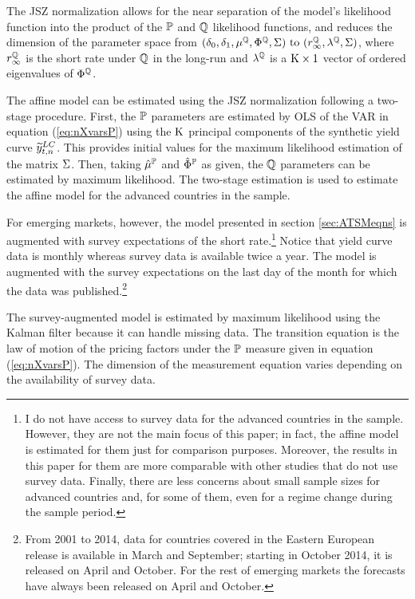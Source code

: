 {The JSZ normalization allows for the near separation of the model's likelihood function into the product of the $\mathbb{P}$ and $\mathbb{Q}$ likelihood functions, and reduces the dimension of the parameter space from \((\deltazero, \deltaone, \XmuQ, \XPhiQ, \XSigma)$ to $(r^{\Qmeasure}_{\infty}, \lambda^{\Qmeasure},\XSigma)\), where \(r^{\mathbb{Q}}_{\infty}\) is the short rate under \(\mathbb{Q}\) in the long-run and \(\lambda^{\mathbb{Q}}\) is a \(\mathrm{K} \times 1\) vector of ordered eigenvalues of \(\Phi^{\mathbb{Q}}\).

The affine model can be estimated using the JSZ normalization following a two-stage procedure. 
First, the \(\mathbb{P}\) parameters are estimated by OLS of the VAR in equation (\ref{eq:nXvarsP}) using the \(\mathrm{K}\) principal components of the synthetic yield curve \(\widetilde{y}_{t,n} ^{LC}\). This provides initial values for the maximum likelihood estimation of the matrix $\Sigma$. Then, taking \(\hat{\mu}^{\mathbb{P}}\) and \(\hat{\Phi}^{\mathbb{P}}\) as given, the \(\mathbb{Q}\) parameters can be estimated by maximum likelihood. The two-stage estimation is used to estimate the affine model for the advanced countries in the sample.

For emerging markets, however, the model presented in section \ref{sec:ATSMeqns} is augmented with survey expectations of the short rate.\footnote{ I do not have access to survey data for the advanced countries in the sample. However, they are not the main focus of this paper; in fact, the affine model is estimated for them just for comparison purposes. Moreover, the results in this paper for them are more comparable with other studies that do not use survey data. Finally, there are less concerns about small sample sizes for advanced countries and, for some of them, even for a regime change during the sample period.} 
Notice that yield curve data is monthly whereas survey data is available twice a year.
The model is augmented with the survey expectations on the last day of the month for which the data was published.\footnote{ From 2001 to 2014, data for countries covered in the Eastern European release is available in March and September; starting in October 2014, it is released on April and October. For the rest of emerging markets the forecasts have always been released on April and October.}

The survey-augmented model is estimated by maximum likelihood using the Kalman filter because it can handle missing data. 
The transition equation is the law of motion of the pricing factors under the \(\mathbb{P}\) measure given in equation (\ref{eq:nXvarsP}).
The dimension of the measurement equation varies depending on the availability of survey data. 

}
